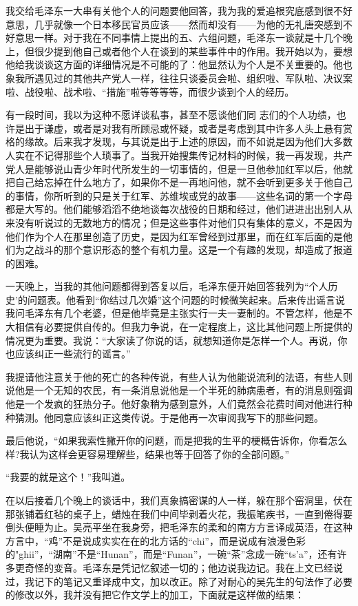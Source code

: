 \documentclass[10pt]{book}
\begin{document}
我交给毛泽东一大串有关他个人的问题要他回答，我为我的爱追根究底感到很不好意思，几乎就像一个日本移民官员应该——然而却没有——为他的无礼唐突感到不好意思一样。对于我在不同事情上提出的五、六组问题，毛泽东一谈就是十几个晚上，但很少提到他自己或者他个人在谈到的某些事件中的作用。我开始以为，要想他给我谈谈这方面的详细情况是不可能的了：他显然认为个人是不关重要的。他也象我所遇见过的其他共产党人一样，往往只谈委员会啦、组织啦、军队啦、决议案啦、战役啦、战术啦、“措施”啦等等等等，而很少谈到个人的经历。

有一段时间，我以为这种不愿详谈私事，甚至不愿谈他们同 志们的个人功绩，也许是出于谦虚，或者是对我有所顾忌或怀疑，或者是考虑到其中许多人头上悬有赏格的缘故。后来我才发现，与其说是出于上述的原因，而不如说是因为他们大多数人实在不记得那些个人琐事了。当我开始搜集传记材料的时候，我一再发现，共产党人是能够说山青少年时代所发生的一切事情的，但是一旦他参加红军以后，他就把自己给忘掉在什么地方了，如果你不是一再地问他，就不会听到更多关于他自己的事情，你所听到的只是关于红军、苏维埃或党的故事——这些名词的第一个字母都是大写的。他们能够滔滔不绝地谈每次战役的日期和经过，他们进进出出别人从来没有听说过的无数地方的情况；但是这些事件对他们只有集体的意义，不是因为他们作为个人在那里创造了历史，是因为红军曾经到过那里，而在红军后面的是他们为之战斗的那个意识形态的整个有机力量。这是一个有趣的发现，却造成了报道的困难。

一天晚上，当我的其他问题都得到答复以后，毛泽东便开始回答我列为“个人历史’的问题表。他看到“你结过几次婚”这个问题的时候微笑起来。后来传出谣言说我问毛泽东有几个老婆，但是他毕竟是主张实行一夫一妻制的。不管怎样，他是不大相信有必要提供自传的。但我力争说，在一定程度上，这比其他问题上所提供的情况更为重要。我说：“大家读了你说的话，就想知道你是怎样一个人。再说，你也应该纠正一些流行的谣言。”

我提请他注意关于他的死亡的各种传说，有些人认为他能说流利的法语，有些人则说他是一个无知的农民，有一条消息说他是一个半死的肺病患者，有的消息则强调他是一个发疯的狂热分子。他好象稍为感到意外，人们竟然会花费时间对他进行种种猜测。他同意应该纠正这类传说。于是他再一次审阅我写下的那些问题。

最后他说，“如果我索性撇开你的问题，而是把我的生平的梗概告诉你，你看怎么样?我认为这样会更容易理解些，结果也等于回答了你的全部问题。”

“我要的就是这个！”我叫道。

在以后接着几个晚上的谈话中，我们真象搞密谋的人一样，躲在那个窑洞里，伏在那张铺着红毡的桌子上，蜡烛在我们中间毕剥着火花，我振笔疾书，一直到倦得要倒头便睡为止。吴亮平坐在我身旁，把毛泽东的柔和的南方方言译成英浯，在这种方言中，“鸡”不是说成实实在在的北方话的“chi”，而是说成有浪漫色彩的"ghii”，“湖南”不是“Hunan”，而是“Funan”，一碗“茶”念成一碗“ts’a”，还有许多更奇怪的变音。毛泽东是凭记忆叙述一切的；他边说我边记。我在上文已经说过，我记下的笔记又重译成中文，加以改正。除了对耐心的吴先生的句法作了必要的修改以外，我并没有把它作文学上的加工，下面就是这样做的结果：
\end{document}
